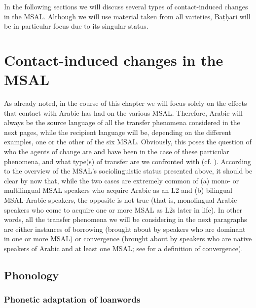 \documentclass[output=paper]{langsci/langscibook}
\begin{document}
In the following sections we will discuss several types of contact-induced changes in the MSAL. Although we will use material taken from all varieties, Baṭḥari will be in particular focus due to its singular status.

\section{Contact-induced changes in the MSAL}\label{sec:3}

As already noted, in the course of this chapter we will focus solely on the effects that contact with Arabic has had on the various MSAL. Therefore, Arabic will always be the source language of all the transfer phenomena considered in the next pages, while the recipient language will be, depending on the different examples, one or the other of the six MSAL. Obviously, this poses the question of who the agents of change are and have been in the case of these particular phenomena, and what type(s) of transfer are we confronted with (cf. \citealt{VanCoetsem1988,VanCoetsem2000,Winford2005}). According to the overview of the MSAL’s sociolinguistic status presented above, it should be clear by now that, while the two cases are extremely common of (a) mono- or multilingual MSAL speakers who acquire Arabic as an L2 and (b) bilingual MSAL-Arabic speakers, the opposite is not true (that is, monolingual Arabic speakers who come to acquire one or more MSAL as L2s later in life). In other words, all the transfer phenomena we will be considering in the next paragraphs are either instances of borrowing (brought about by speakers who are dominant in one or more MSAL) or convergence (brought about by speakers who are native speakers of Arabic and at least one MSAL; see \citealt{Lucas2015} for a definition of convergence). 


 
 \subsection{Phonology}
 \subsubsection{Phonetic adaptation of loanwords}
\end{document}

